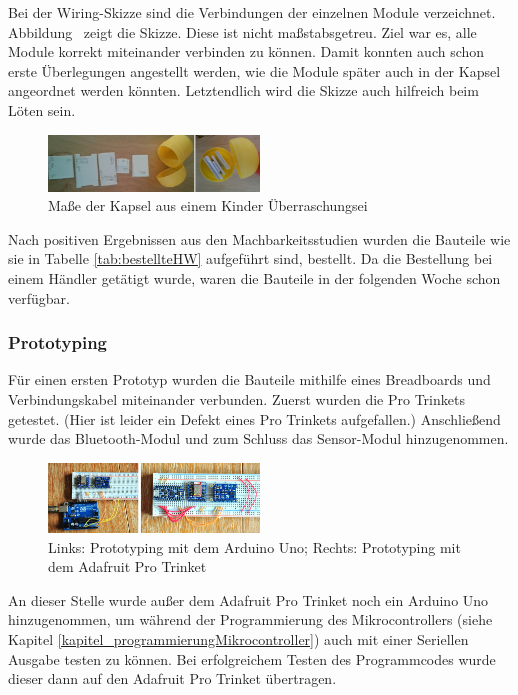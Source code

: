{Bei der Wiring-Skizze sind die Verbindungen der einzelnen Module verzeichnet. Abbildung \ zeigt die Skizze. Diese ist nicht maßstabsgetreu. Ziel war es, alle Module korrekt miteinander verbinden zu können. Damit konnten auch schon erste Überlegungen angestellt werden, wie die Module später auch in der Kapsel angeordnet werden könnten. Letztendlich wird die Skizze auch hilfreich beim Löten sein.

\begin{figure}[ht]
	\centering
	\includegraphics[width=0.5\textwidth]{images/k3-machbarkeitsstudie.PNG}
	\caption {Maße der Kapsel aus einem Kinder Überraschungsei}
	\label{fig:k3}
\end{figure}

Nach positiven Ergebnissen aus den Machbarkeitsstudien wurden die Bauteile wie sie in Tabelle \ref{tab:bestellteHW} aufgeführt sind, bestellt. Da die Bestellung bei einem Händler getätigt wurde, waren die Bauteile in der folgenden Woche schon verfügbar.

\subsubsection{Prototyping}

Für einen ersten Prototyp wurden die Bauteile mithilfe eines Breadboards und Verbindungskabel miteinander verbunden. Zuerst wurden die Pro Trinkets getestet. (Hier ist leider ein Defekt eines Pro Trinkets aufgefallen.) Anschließend wurde das Bluetooth-Modul und zum Schluss das Sensor-Modul hinzugenommen.

\begin{figure}[ht]
	\centering
	\includegraphics[width=0.5\textwidth]{images/k3-prototyping.PNG}
	\caption {Links: Prototyping mit dem Arduino Uno; Rechts: Prototyping mit dem Adafruit Pro
		Trinket}
	\label{fig:k3_prototyping}
\end{figure}

An dieser Stelle wurde außer dem Adafruit Pro Trinket noch ein Arduino Uno hinzugenommen, um während der Programmierung des Mikrocontrollers (siehe Kapitel \ref{kapitel_programmierungMikrocontroller}) auch mit einer Seriellen Ausgabe testen zu können. Bei erfolgreichem Testen des Programmcodes wurde dieser dann auf den Adafruit Pro Trinket übertragen.

}
